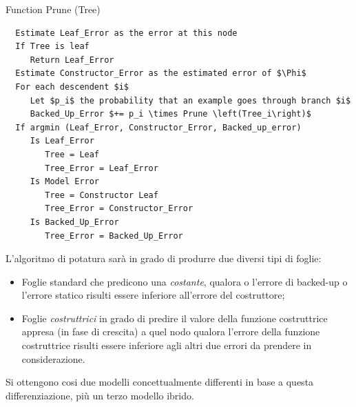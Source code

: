 
\begin{algorithm}
	\caption{Function Prune (Tree)}
	\begin{lstlisting}
  Estimate Leaf_Error as the error at this node
  If Tree is leaf 
     Return Leaf_Error
  Estimate Constructor_Error as the estimated error of $\Phi$
  For each descendent $i$
     Let $p_i$ the probability that an example goes through branch $i$
     Backed_Up_Error $+= p_i \times Prune \left(Tree_i\right)$
  If argmin (Leaf_Error, Constructor_Error, Backed_up_error)
     Is Leaf_Error
        Tree = Leaf
        Tree_Error = Leaf_Error
     Is Model Error
        Tree = Constructor Leaf
        Tree_Error = Constructor_Error
     Is Backed_Up_Error
        Tree_Error = Backed_Up_Error
	\end{lstlisting}
\end{algorithm}

L'algoritmo di potatura sarà in grado di produrre due diversi tipi di foglie: 
\begin{itemize}
	\item Foglie standard che predicono una \emph{costante}, qualora o l'errore di backed-up o l'errore statico risulti essere inferiore all'errore del costruttore;	
	\item Foglie \emph{costruttrici} in grado di predire il valore della funzione costruttrice appresa (in fase di crescita) a quel nodo qualora l'errore della funzione costruttrice risulti essere inferiore agli altri due errori da prendere in considerazione.
\end{itemize}
Si ottengono cosi due modelli concettualmente differenti in base a questa differenziazione, più un terzo modello ibrido.

